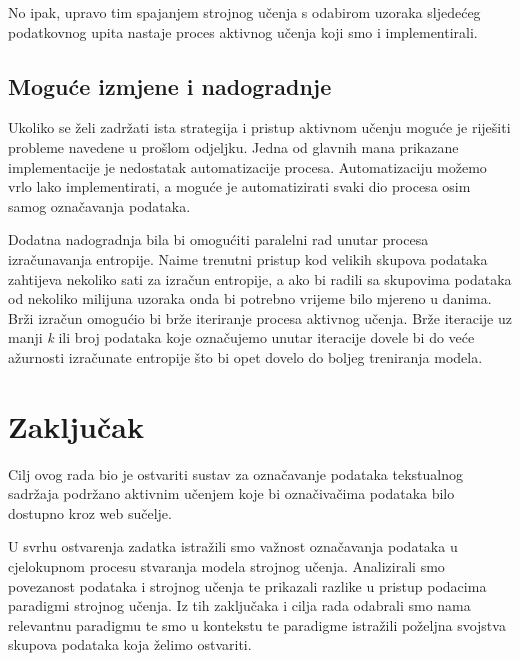 \documentclass[times, utf8, zavrsni, numeric]{fer}
\begin{document}
No ipak, upravo tim spajanjem strojnog učenja s odabirom uzoraka sljedećeg podatkovnog upita nastaje proces aktivnog učenja koji smo i implementirali.


\section{Moguće izmjene i nadogradnje}

Ukoliko se želi zadržati ista strategija i pristup aktivnom učenju moguće je riješiti probleme navedene u prošlom odjeljku. Jedna od glavnih mana prikazane implementacije je nedostatak automatizacije procesa. Automatizaciju možemo vrlo lako implementirati, a moguće je automatizirati svaki dio procesa osim samog označavanja podataka.

Dodatna nadogradnja bila bi omogućiti paralelni rad unutar procesa izračunavanja entropije. Naime trenutni pristup kod velikih skupova podataka zahtijeva nekoliko sati za izračun entropije, a ako bi radili sa skupovima podataka od nekoliko milijuna uzoraka onda bi potrebno vrijeme bilo mjereno u danima. Brži izračun omogućio bi brže iteriranje procesa aktivnog učenja. Brže iteracije uz manji \textit{k} ili broj podataka koje označujemo unutar iteracije dovele bi do veće ažurnosti izračunate entropije što bi opet dovelo do boljeg treniranja modela.


\chapter{Zaključak}
Cilj ovog rada bio je ostvariti sustav za označavanje podataka tekstualnog sadržaja podržano aktivnim učenjem koje bi označivačima podataka bilo dostupno kroz web sučelje.

U svrhu ostvarenja zadatka istražili smo važnost označavanja podataka u cjelokupnom procesu stvaranja modela strojnog učenja. Analizirali smo povezanost podataka i strojnog učenja te prikazali razlike u pristup podacima paradigmi strojnog učenja. Iz tih zaključaka i cilja rada odabrali smo nama relevantnu paradigmu te smo u kontekstu te paradigme istražili poželjna svojstva skupova podataka koja želimo ostvariti.
\end{document}
